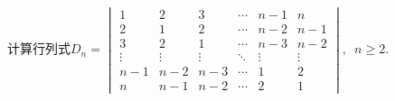 \begin{example}{}{}
    计算行列式$D_n=\begin{vmatrix}
            1      & 2      & 3      & \cdots & n-1    & n      \\
            2      & 1      & 2      & \cdots & n-2    & n-1    \\
            3      & 2      & 1      & \cdots & n-3    & n-2    \\
            \vdots & \vdots & \vdots & \ddots & \vdots & \vdots \\
            n-1    & n-2    & n-3    & \cdots & 1      & 2      \\
            n      & n-1    & n-2    & \cdots & 2      & 1
        \end{vmatrix},\enspace n \geqslant 2$.
\end{example}

